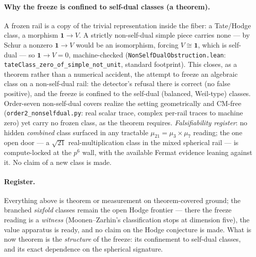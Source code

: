 \documentclass[11pt]{article}
\theoremstyle{definition}
\theoremstyle{remark}
\begin{document}
\paragraph{Why the freeze is confined to self-dual classes (a theorem).} A
frozen rail is a copy of the trivial representation inside the fiber: a
Tate/Hodge class, a morphism $\mathbf 1\to V$. A strictly non-self-dual simple
piece carries none --- by Schur a nonzero $\mathbf 1\to V$ would be an
isomorphism, forcing $V\cong\mathbf 1$, which is self-dual --- so
$\mathbf 1\to V=0$, machine-checked (\texttt{NonSelfDualObstruction.lean}:
\texttt{tateClass\_zero\_of\_simple\_not\_unit}, standard footprint). This
closes, as a theorem rather than a numerical accident, the attempt to freeze
an algebraic class on a non-self-dual rail: the detector's refusal there is
correct (no false positive), and the freeze is confined to the self-dual
(balanced, Weil-type) classes. Order-seven non-self-dual covers realize the
setting geometrically and CM-free (\texttt{order2\_nonselfdual.py}: real
scalar trace, complex per-rail traces to machine zero) yet carry no frozen
class, as the theorem requires. \emph{Falsifiability register}: no hidden
\emph{combined} class surfaced in any tractable $\mu_{21}=\mu_3\times\mu_7$
reading; the one open door --- a $\sqrt{21}$ real-multiplication class in the
mixed spherical rail --- is compute-locked at the $p^6$ wall, with the
available Fermat evidence leaning against it. No claim of a new class is made.

\paragraph{Register.} Everything above is theorem or measurement on
theorem-covered ground; the branched \emph{sixfold} classes remain the open
Hodge frontier --- there the freeze reading is a \emph{witness}
(Moonen--Zarhin's classification stops at dimension five), the value
apparatus is ready, and no claim on the Hodge conjecture is made. What is
now theorem is the \emph{structure} of the freeze: its confinement to
self-dual classes, and its exact dependence on the spherical signature.
\end{document}
